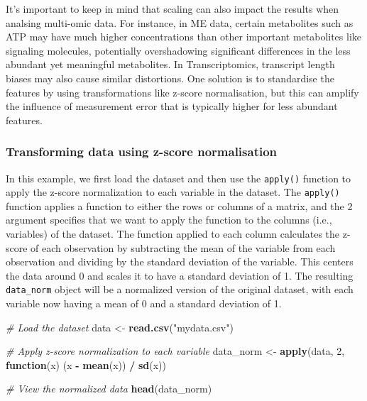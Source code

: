 \documentclass[
]{book}
\newenvironment{Shaded}{\begin{snugshade}}{\end{snugshade}}
\newcommand{\CommentTok}[1]{\textcolor[rgb]{0.56,0.35,0.01}{\textit{#1}}}
\newcommand{\ControlFlowTok}[1]{\textcolor[rgb]{0.13,0.29,0.53}{\textbf{#1}}}
\newcommand{\DecValTok}[1]{\textcolor[rgb]{0.00,0.00,0.81}{#1}}
\newcommand{\FunctionTok}[1]{\textcolor[rgb]{0.13,0.29,0.53}{\textbf{#1}}}
\newcommand{\NormalTok}[1]{#1}
\newcommand{\OtherTok}[1]{\textcolor[rgb]{0.56,0.35,0.01}{#1}}
\newcommand{\SpecialCharTok}[1]{\textcolor[rgb]{0.81,0.36,0.00}{\textbf{#1}}}
\newcommand{\StringTok}[1]{\textcolor[rgb]{0.31,0.60,0.02}{#1}}
\begin{document}
It's important to keep in mind that scaling can also impact the results when analsing multi-omic data. For instance, in ME data, certain metabolites such as ATP may have much higher concentrations than other important metabolites like signaling molecules, potentially overshadowing significant differences in the less abundant yet meaningful metabolites. In Transcriptomics, transcript length biases may also cause similar distortions. One solution is to standardise the features by using transformations like z-score normalisation, but this can amplify the influence of measurement error that is typically higher for less abundant features.

\hypertarget{transforming-data-using-z-score-normalisation}{%
\subsubsection*{Transforming data using z-score normalisation}\label{transforming-data-using-z-score-normalisation}}

In this example, we first load the dataset and then use the \texttt{apply()} function to apply the z-score normalization to each variable in the dataset. The \texttt{apply()} function applies a function to either the rows or columns of a matrix, and the 2 argument specifies that we want to apply the function to the columns (i.e., variables) of the dataset. The function applied to each column calculates the z-score of each observation by subtracting the mean of the variable from each observation and dividing by the standard deviation of the variable. This centers the data around 0 and scales it to have a standard deviation of 1. The resulting \texttt{data\_norm} object will be a normalized version of the original dataset, with each variable now having a mean of 0 and a standard deviation of 1.

\small

\begin{Shaded}
\begin{Highlighting}[]
\CommentTok{\# Load the dataset}
\NormalTok{data }\OtherTok{\textless{}{-}} \FunctionTok{read.csv}\NormalTok{(}\StringTok{"mydata.csv"}\NormalTok{)}

\CommentTok{\# Apply z{-}score normalization to each variable}
\NormalTok{data\_norm }\OtherTok{\textless{}{-}} \FunctionTok{apply}\NormalTok{(data, }\DecValTok{2}\NormalTok{, }\ControlFlowTok{function}\NormalTok{(x) (x }\SpecialCharTok{{-}} \FunctionTok{mean}\NormalTok{(x)) }\SpecialCharTok{/} \FunctionTok{sd}\NormalTok{(x))}

\CommentTok{\# View the normalized data}
\FunctionTok{head}\NormalTok{(data\_norm)}
\end{Highlighting}
\end{Shaded}
\end{document}
